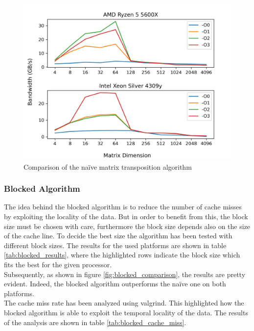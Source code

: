 \documentclass{article}
\begin{document}
\begin{figure}[H]
    \centering
    \includegraphics[scale=0.8]{report/img/naive_comparison.png}
    \caption{Comparison of the na\"{i}ve matrix transposition algorithm}
    \label{fig:naive_comparison}
\end{figure}
\subsubsection{Blocked Algorithm}
The idea behind the blocked algorithm is to reduce the number of cache misses by exploiting the locality of the data. But in order to benefit from this, the block
size must be chosen with care, furthermore the block size depends also on the size of the cache line. To decide the best size the algorithm has been 
tested with different block sizes. The results for the used platforms are shown in table \ref{tab:blocked_results}, where the highlighted rows indicate the 
block size which fits the best for the given processor. \\
Subsequently, as shown in figure \ref{fig:blocked_comparison}, the results are pretty evident. Indeed, the blocked algorithm outperforms the na\"{i}ve one on both platforms. \\
The cache miss rate has been analyzed using valgrind. This highlighted how the blocked algorithm is able to exploit the temporal locality of the data.
The results of the analysis are shown in table \ref{tab:blocked_cache_miss}. \\
\end{document}
